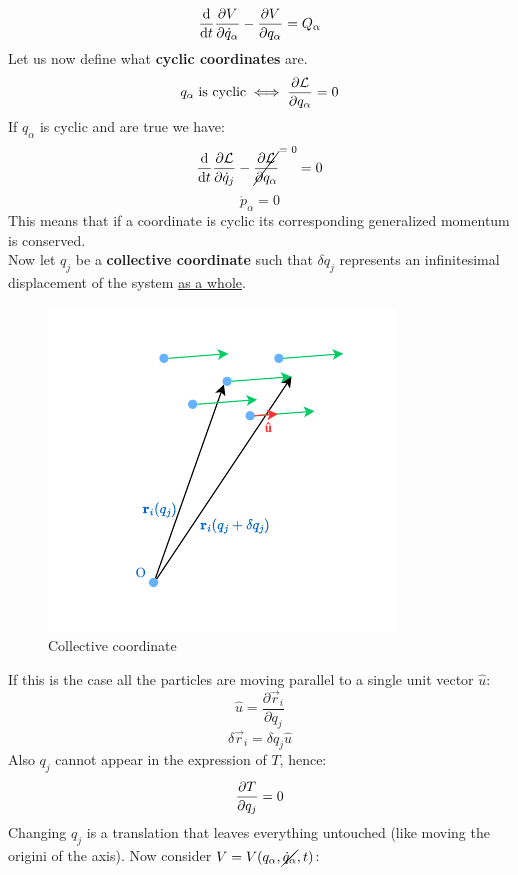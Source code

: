 \begin{equation}
    \dfrac{\mathrm{d} }{\mathrm{d}t}\dfrac{\partial V}{\partial \dot{q}_{\alpha}}-\dfrac{\partial V}{\partial q_{\alpha}} = Q_{\alpha}
\end{equation}
Let us now define what \textbf{cyclic coordinates} are.
\begin{equation}
    q_{\alpha}\;\text{is cyclic} \iff \dfrac{\partial \mathcal{L}}{\partial q_{\alpha}} = 0
\end{equation}
If $q_{\alpha}$ is cyclic and \eleref\;are true we have:
\begin{equation}
    \totalD{}{t} \partialD{\lagr}{\dot{q}_j} - \crossout{\partialD{\lagr}{q_{\alpha}}} = 0
\end{equation}
\begin{equation}
    \dot{p}_{\alpha} = 0
\end{equation}
This means that if a coordinate is cyclic its corresponding generalized momentum is conserved.\\
Now let $q_j$ be a \textbf{collective coordinate} such that $\delta q_j$ represents an infinitesimal displacement of the system \underline{as a whole}.
\begin{figure}[!ht]
    \centering
    \includegraphics[width=0.4\linewidth]{res/svg/collectivecoord.drawio}
    \caption{Collective coordinate}
\end{figure}
If this is the case all the particles are moving parallel to a single unit vector $\hat{u}$:
\begin{equation}
    \hat{u} = \dfrac{\partial \vec{r}_i}{\partial q_j}
\end{equation}
\begin{equation}
    \delta \vec{r}_i = \delta q_j \hat{u}
\end{equation}
Also $q_j$ cannot appear in the expression of $T$, hence:
\begin{equation}
    \dfrac{\partial T}{\partial q_j}=0
\end{equation}
Changing $q_j$ is a translation that leaves everything untouched (like moving the origini of the axis). Now consider $V=V(q_{\alpha},\cancel{\dot{q}_{\alpha}},t)$:
